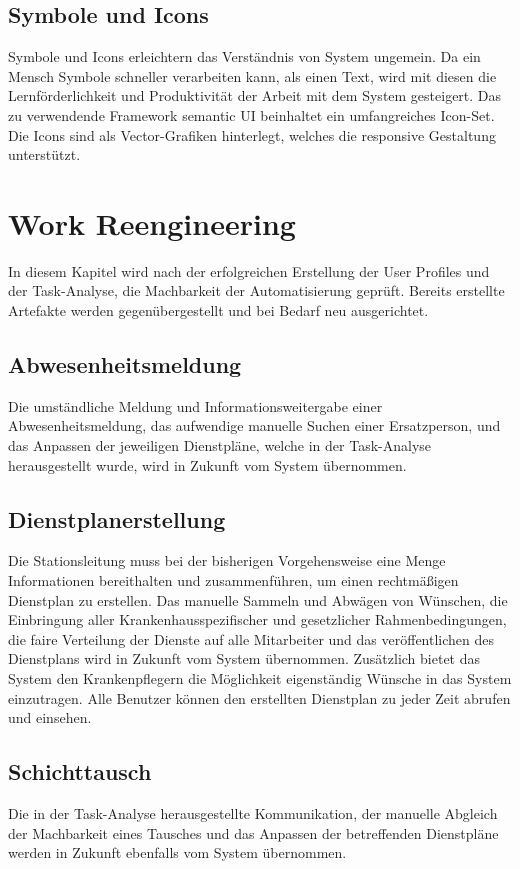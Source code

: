 \documentclass[11pt,
paper=a4,
bibtotocnumbered,	  %
liststotocnumbered,  %
DIV=calc,		  %
tablecaptionabove,	  %
headinclude,
]{article}
\begin{document}
\subsection{Symbole und Icons}
Symbole und Icons erleichtern das Verständnis von System ungemein. Da ein Mensch Symbole schneller verarbeiten kann, als einen Text, wird mit diesen die Lernförderlichkeit und Produktivität der Arbeit mit dem System gesteigert. Das zu verwendende Framework semantic UI beinhaltet ein umfangreiches Icon-Set. Die Icons sind als Vector-Grafiken hinterlegt, welches die responsive Gestaltung unterstützt.
\section{Work Reengineering}
In diesem Kapitel wird nach der erfolgreichen Erstellung der User Profiles und der Task-Analyse, die Machbarkeit der Automatisierung geprüft. Bereits erstellte Artefakte werden gegenübergestellt und bei Bedarf neu ausgerichtet.
\subsection{Abwesenheitsmeldung}
Die umständliche Meldung und Informationsweitergabe einer Abwesenheitsmeldung, das aufwendige manuelle Suchen einer Ersatzperson, und das Anpassen der jeweiligen Dienstpläne, welche in der Task-Analyse herausgestellt wurde, wird in Zukunft vom System übernommen.
\subsection{Dienstplanerstellung}
Die Stationsleitung muss bei der bisherigen Vorgehensweise eine Menge Informationen bereithalten und zusammenführen, um einen rechtmäßigen Dienstplan zu erstellen. Das manuelle Sammeln und Abwägen von Wünschen, die Einbringung aller Krankenhausspezifischer und gesetzlicher Rahmenbedingungen, die faire Verteilung der Dienste auf alle Mitarbeiter und das veröffentlichen des Dienstplans wird in Zukunft vom System übernommen. Zusätzlich bietet das System den Krankenpflegern die Möglichkeit eigenständig Wünsche in das System einzutragen. Alle Benutzer können den erstellten Dienstplan zu jeder Zeit abrufen und einsehen.
\subsection{Schichttausch}
Die in der Task-Analyse herausgestellte Kommunikation, der manuelle Abgleich der Machbarkeit eines Tausches und das Anpassen der betreffenden Dienstpläne werden in Zukunft ebenfalls vom System übernommen.
\end{document}
